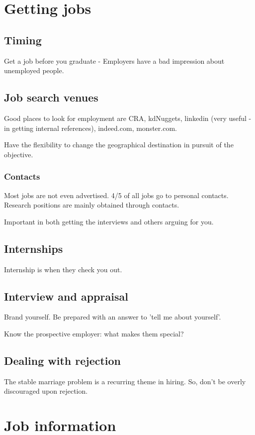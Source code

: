 \documentclass[oneside, article]{memoir}
\begin{document}
\section{Getting jobs}
\subsection{Timing}
Get a job before you graduate - Employers have a bad impression about unemployed people.

\subsection{Job search venues}
Good places to look for employment are CRA, kdNuggets, linkedin (very useful - in getting internal references), indeed.com, monster.com.

Have the flexibility to change the geographical destination in pursuit of the objective.

\subsubsection{Contacts}
Most jobs are not even advertised. 4/5 of all jobs go to personal contacts. Research positions are mainly obtained through contacts.

Important in both getting the interviews and others arguing for you.

\subsection{Internships}
Internship is when they check you out.

\subsection{Interview and appraisal}
Brand yourself. Be prepared with an answer to 'tell me about yourself'.

Know the prospective employer: what makes them special?

\subsection{Dealing with rejection}
The stable marriage problem is a recurring theme in hiring. So, don't be overly discouraged upon rejection.

\section{Job information}
\end{document}
